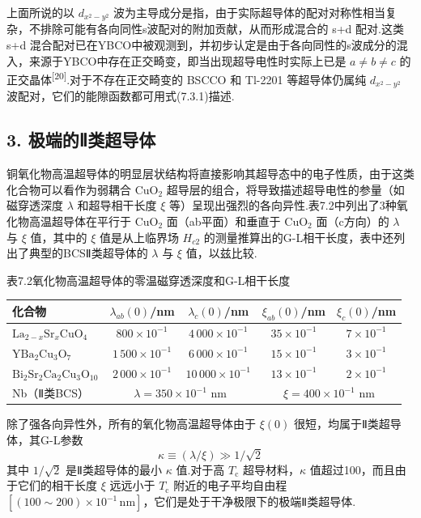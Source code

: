 上面所说的以 $d_{x^{2}-y^{2}}$ 波为主导成分是指，由于实际超导体的配对对称性相当复杂，不排除可能有各向同性s波配对的附加贡献，从而形成混合的 s+d 配对.这类 s+d 混合配对已在YBCO中被观测到，并初步认定是由于各向同性的s波成分的混入，来源于YBCO中存在正交畸变，即当出现超导电性时实际上已是 $a\neq b\neq c$ 的正交晶体\textsuperscript{[20]}.对于不存在正交畸变的 BSCCO 和 Tl-2201 等超导体仍属纯 $d_{x^{2}-y^{2}}$ 波配对，它们的能隙函数都可用式(7.3.1)描述.

\subsection*{3. 极端的Ⅱ类超导体}

铜氧化物高温超导体的明显层状结构将直接影响其超导态中的电子性质，由于这类化合物可以看作为弱耦合 $\mathrm{CuO}_{2}$ 超导层的组合，将导致描述超导电性的参量（如磁穿透深度 $\lambda$ 和超导相干长度 $\xi$ 等）呈现出强烈的各向异性.表7.2中列出了3种氧化物高温超导体在平行于 $\mathrm{CuO}_{2}$ 面（ab平面）和垂直于 $\mathrm{CuO}_{2}$ 面（c方向）的 $\lambda$ 与 $\xi$ 值，其中的 $\xi$ 值是从上临界场 $H_{c2}$ 的测量推算出的G-L相干长度，表中还列出了典型的BCSⅡ类超导体的 $\lambda$ 与 $\xi$ 值，以兹比较.

表7.2\quad 氧化物高温超导体的零温磁穿透深度和G-L相干长度

\begin{center}\small
\begin{tabular}{lcccc}
\hline
化合物 & $\lambda_{ab}(0)$/nm & $\lambda_{c}(0)$/nm & $\xi_{ab}(0)$/nm & $\xi_{c}(0)$/nm\\
\hline
$\mathrm{La}_{2-x}\mathrm{Sr}_{x}\mathrm{CuO}_{4}$ & $800\times10^{-1}$ & $4\,000\times10^{-1}$ & $35\times10^{-1}$ & $7\times10^{-1}$\\
$\mathrm{YBa}_{2}\mathrm{Cu}_{3}\mathrm{O}_{7}$ & $1\,500\times10^{-1}$ & $6\,000\times10^{-1}$ & $15\times10^{-1}$ & $3\times10^{-1}$\\
$\mathrm{Bi}_{2}\mathrm{Sr}_{2}\mathrm{Ca}_{2}\mathrm{Cu}_{3}\mathrm{O}_{10}$ & $2\,000\times10^{-1}$ & $10\,000\times10^{-1}$ & $13\times10^{-1}$ & $2\times10^{-1}$\\
\hline
Nb（Ⅱ类BCS） & \multicolumn{2}{c}{$\lambda=350\times10^{-1}$ nm} & \multicolumn{2}{c}{$\xi=400\times10^{-1}$ nm}\\
\hline
\end{tabular}
\end{center}

除了强各向异性外，所有的氧化物高温超导体由于 $\xi(0)$ 很短，均属于Ⅱ类超导体，其G-L参数
\begin{equation}
  \kappa\equiv\left(\lambda/\xi\right)\gg1/\sqrt{2}
\end{equation}
其中 $1/\sqrt{2}$ 是Ⅱ类超导体的最小 $\kappa$ 值.对于高 $T_{\mathrm{c}}$ 超导材料，$\kappa$ 值超过100，而且由于它们的相干长度 $\xi$ 远远小于 $T_{\mathrm{c}}$ 附近的电子平均自由程 $\left[\left(100\sim200\right)\times10^{-1}\,\mathrm{nm}\right]$，它们是处于干净极限下的极端Ⅱ类超导体.

